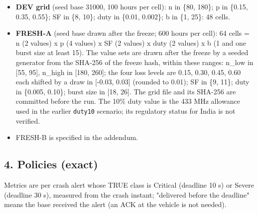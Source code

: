 \begin{itemize}
\item \textbf{DEV grid} (seed base 31000, 100 hours per cell): n in \{80, 180\}; p in \{0.15, 0.35, 0.55\}; SF in \{8, 10\}; duty in \{0.01, 0.002\}; b in \{1, 25\}: 48 cells.
\item \textbf{FRESH-A} (seed base drawn after the freeze; 600 hours per cell): 64 cells = n (2 values) x p (4 values) x SF (2 values) x duty (2 values) x b (1 and one burst size at least 15). The value sets are drawn after the freeze by a seeded generator from the SHA-256 of the freeze hash, within these ranges: n\_low in [55, 95], n\_high in [180, 260]; the four loss levels are 0.15, 0.30, 0.45, 0.60 each shifted by a draw in [-0.03, 0.03] (rounded to 0.01); SF in \{9, 11\}; duty in \{0.005, 0.10\}; burst size in [18, 26]. The grid file and its SHA-256 are committed before the run. The 10\% duty value is the 433 MHz allowance used in the earlier \texttt{duty10} scenario; its regulatory status for India is not verified.
\item FRESH-B is specified in the addendum.
\end{itemize}

\subsection*{4. Policies (exact)}
Metrics are per crash alert whose TRUE class is Critical (deadline 10 s) or Severe (deadline 30 s), measured from the crash instant; "delivered before the deadline" means the base received the alert (an ACK at the vehicle is not needed).

